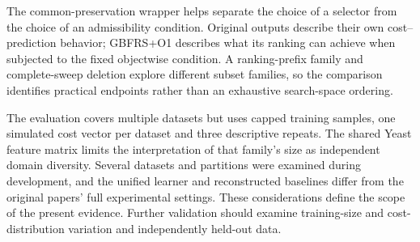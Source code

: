 The common-preservation wrapper helps separate the choice of a selector from the choice of an admissibility condition. Original outputs describe their own cost--prediction behavior; GBFRS+O1 describes what its ranking can achieve when subjected to the fixed objectwise condition. A ranking-prefix family and complete-sweep deletion explore different subset families, so the comparison identifies practical endpoints rather than an exhaustive search-space ordering.

The evaluation covers multiple datasets but uses capped training samples, one simulated cost vector per dataset and three descriptive repeats. The shared Yeast feature matrix limits the interpretation of that family's size as independent domain diversity. Several datasets and partitions were examined during development, and the unified learner and reconstructed baselines differ from the original papers' full experimental settings. These considerations define the scope of the present evidence. Further validation should examine training-size and cost-distribution variation and independently held-out data.
